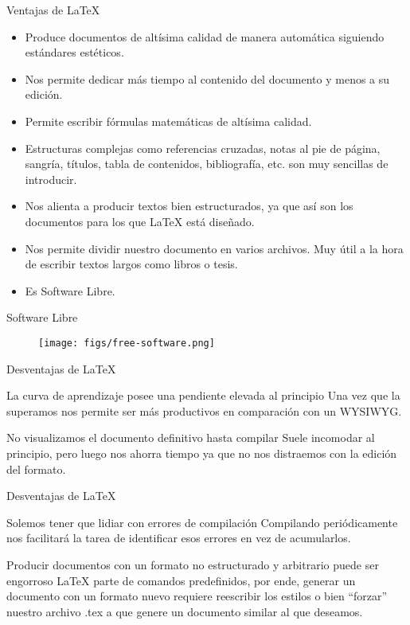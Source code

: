 \documentclass[11pt]{beamer}
\begin{document}
\begin{frame}{Ventajas de \LaTeX}
\begin{itemize}[<+- | alert@+>]
  \item Produce documentos de altísima calidad de manera automática siguiendo estándares estéticos.
  \item Nos permite dedicar más tiempo al contenido del documento y menos a su edición.
  \item Permite escribir fórmulas matemáticas de altísima calidad.
  \item Estructuras complejas como referencias cruzadas, notas al pie de página, sangría, títulos, tabla de contenidos, bibliografía, etc. son muy sencillas de introducir.
  \item Nos alienta a producir textos bien estructurados, ya que así son los documentos para los que \LaTeX{} está diseñado.
  \item Nos permite dividir nuestro documento en varios archivos. Muy útil a la hora de escribir textos largos como libros o tesis.
  \item Es Software Libre.
\end{itemize}
\end{frame}

\begin{frame}{Software Libre}
\begin{figure}
\centering
\texttt{[image: figs/free-software.png]}
\end{figure}
\end{frame}


\begin{frame}{Desventajas de \LaTeX}
\begin{block}{La curva de aprendizaje posee una pendiente elevada al principio}
Una vez que la superamos nos permite ser más productivos en comparación con un WYSIWYG.
\end{block}

\pause
\begin{block}{No visualizamos el documento definitivo hasta compilar}
Suele incomodar al principio, pero luego nos ahorra tiempo ya que no nos distraemos con la edición del formato.
\end{block}
\end{frame}

\begin{frame}{Desventajas de \LaTeX}
\begin{block}{Solemos tener que lidiar con errores de compilación}
Compilando periódicamente nos facilitará la tarea de identificar esos errores en vez de acumularlos.
\end{block}

\pause
\begin{block}{Producir documentos con un formato no estructurado y arbitrario puede ser engorroso}
{\LaTeX} parte de comandos predefinidos, por ende, generar un documento con un formato nuevo requiere reescribir los estilos o bien ``forzar'' nuestro archivo .tex a que genere un documento similar al que deseamos.
\end{block}
\end{frame}
\end{document}
